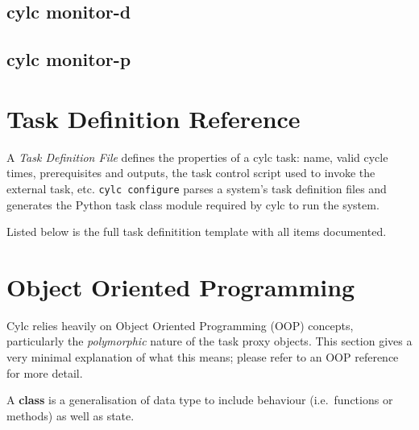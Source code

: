 \documentclass[11pt,a4paper]{article}
\begin{document}
\subsection{cylc monitor-d}
{

}

\subsection{cylc monitor-p}
{

}

\pagebreak
\section{Task Definition Reference}

A {\em Task Definition File} defines the properties of a cylc task:
name, valid cycle times, prerequisites and outputs, the task
control script used to invoke the external task, etc.  
\lstinline=cylc configure= parses a system's task definition files and
generates the Python task class module required by cylc to run the
system.

Listed below is the full task definitition template with all items documented.

\lstset{language=cylctaskdef}

{

}

\lstset{language=}



\pagebreak
\appendix

\section{Object Oriented Programming}

Cylc relies heavily on Object Oriented Programming (OOP) concepts,
particularly the {\em polymorphic} nature of the task proxy objects.
This section gives a very minimal explanation of what this means;
please refer to an OOP reference for more detail.

A {\bf class} is a generalisation of data type to include behaviour
(i.e.\ functions or methods) as well as state. 
\end{document}

